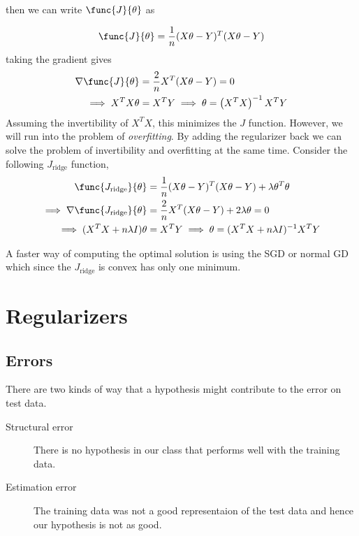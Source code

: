 then we can write \(\func{J}{\theta}\) as

\begin{equation*}
    \func{J}{\theta} = \frac{1}{n} (X\theta - Y)^T (X\theta-Y)
\end{equation*}
taking the gradient gives 
\begin{align*}
    \nabla \func{J}{\theta} &= \dfrac{2}{n} X^T (X\theta - Y) = 0\\
    \implies  X^T X\theta &= X^T Y \implies \theta = \left(X^T X\right)^{-1} X^T Y
\end{align*}
Assuming the invertibility of \(X^TX\), this minimizes the \(J\) function. However, we will run into the problem of \textit{overfitting}. By adding the regularizer back we can solve the problem of invertibility and overfitting at the same time. Consider the following \(J_{\mathrm{ridge}}\) function, 
\begin{align*}
    \func{J_{\mathrm{ridge}}}{\theta} &= \frac{1}{n} (X\theta - Y)^T (X\theta-Y) + \lambda \theta^T \theta \\
     \implies \nabla \func{J_{\mathrm{ridge}}}{\theta} &= \dfrac{2}{n} X^T (X\theta - Y) + 2\lambda \theta  = 0\\ 
     \implies  (X^TX + n \lambda I) \theta &= X^T Y \implies \theta  = (X^TX + n \lambda I )^{-1} X^T Y
\end{align*}

A faster way of computing the optimal solution is using the SGD or normal GD which since the \(J_{\mathrm{ridge}}\) is convex has only one minimum.

\section{Regularizers}
\subsection{Errors}
There are two kinds of way that a hypothesis might contribute to the error on test data.
\begin{description}
    \item [Structural error] There is no hypothesis in our class that performs well with the training data.
    \item [Estimation error] The training data was not a good representaion of the test data and hence our hypothesis is not as good.
\end{description}
